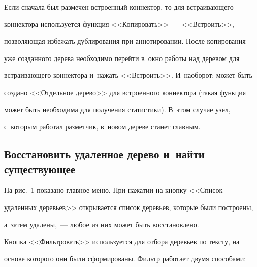 \vspace*{-2pt}





  Если сначала был размечен встроенный коннектор, то для встраивающего 


коннектора используется функция <<Копировать>>~--- <<Встроить>>, 


позволяющая избежать дублирования при аннотировании. После копирования 


уже созданного дерева необходимо перейти в~окно работы над деревом для 


встраивающего коннектора и~нажать <<Встроить>>. И~наоборот: может быть 


создано <<Отдельное дерево>> для встроенного коннектора (такая функция 


может быть необходима для получения статистики). В~этом случае узел, 


с~которым работал разметчик, в~новом дереве станет главным. 





\vspace*{-6pt}


  


\subsection{Восстановить удаленное дерево и~найти существующее}





\vspace*{-2pt}


  


  На рис.~1 показано главное меню. При нажатии на кнопку <<Список 


удаленных деревьев>> открывается список деревьев, которые были по\-стро\-ены, 


а~затем удалены,~--- любое из них может быть восстановлено.




  Кнопка <<Фильтровать>> используется для отбора деревьев по текс\-ту, на 


основе которого они были сформированы. Фильтр работает двумя способами:





\noindent


